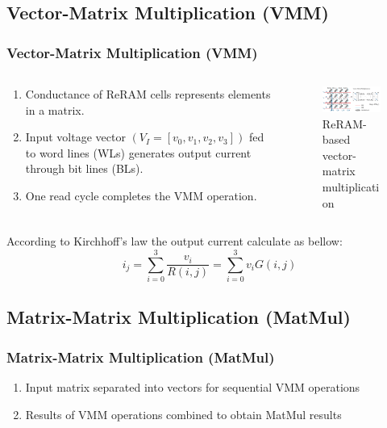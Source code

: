 \documentclass[
	12pt, %
]{beamer}
\begin{document}
\subsection{Vector-Matrix Multiplication (VMM)}
\begin{frame}
	\frametitle{Vector-Matrix Multiplication (VMM)}
	\begin{columns}
		\begin{column}{0.5\textwidth}
			\begin{enumerate}
				\item 
				Conductance of ReRAM cells represents elements in a matrix.
				
				\item 
				Input voltage vector $(V_I=[v_0, v_1, v_2, v_3])$ fed to word lines (WLs) generates output current through bit lines (BLs).
				
				\item 
				One read cycle completes the VMM operation.
			\end{enumerate}
		\end{column}
		
		\begin{column}{0.5\textwidth}
			\begin{figure}
				\includegraphics[width=6.4cm]{Images/img2.png}
				\caption{ReRAM-based vector-matrix multiplication}
			\end{figure}
		\end{column}
	\end{columns}
	According to Kirchhoff’s law the output current calculate as bellow: \\
	$$ i_j=\sum_{i=0}^{3} \frac{v_i}{R(i,j)}=\sum_{i=0}^{3}v_iG(i, j) $$		
\end{frame}



\subsection{Matrix-Matrix Multiplication (MatMul)}
\begin{frame}
	\frametitle{Matrix-Matrix Multiplication (MatMul)}
	\begin{enumerate}
		\item Input matrix separated into vectors for sequential VMM operations
		\item Results of VMM operations combined to obtain MatMul results
	\end{enumerate}
\end{frame}
\end{document}
